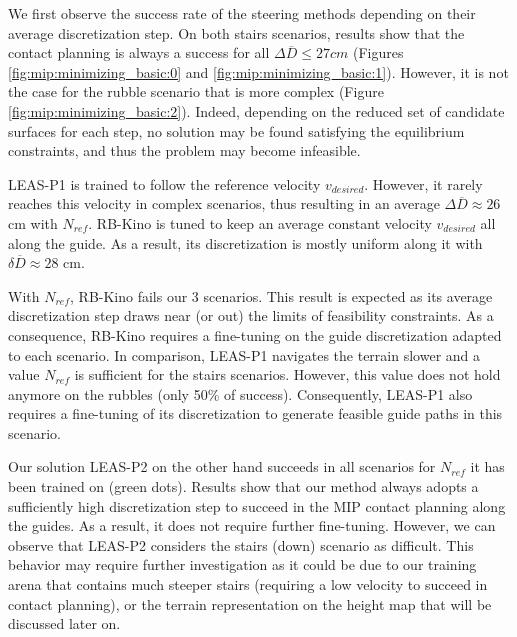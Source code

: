 We first observe the success rate of the steering methods depending on their average discretization step.
On both stairs scenarios, results show that the contact planning is always a success for all $\Delta \overline{D} \leq 27 cm$ (Figures \ref{fig:mip:minimizing_basic:0} and \ref{fig:mip:minimizing_basic:1}).
However, it is not the case for the rubble scenario that is more complex (Figure \ref{fig:mip:minimizing_basic:2}). Indeed, depending on the reduced set of candidate surfaces for each step, no solution may be found satisfying the equilibrium constraints, and thus the problem may become infeasible.

LEAS-P1 is trained to follow the reference velocity $v_{desired}$.
However, it rarely reaches this velocity in complex scenarios, thus resulting in an average $\Delta \overline{D} \approx 26$ cm with $N_{ref}$.
RB-Kino is tuned to keep an average constant velocity $v_{desired}$ all along the guide. As a result, its discretization is mostly uniform along it with $\delta \overline{D} \approx 28$ cm.

With $N_{ref}$, RB-Kino fails our 3 scenarios. This result is expected as its average discretization step draws near (or out) the limits of feasibility constraints.
As a consequence, RB-Kino requires a fine-tuning on the guide discretization adapted to each scenario.
In comparison, LEAS-P1 navigates the terrain slower and a value $N_{ref}$ is sufficient for the stairs scenarios. 
However, this value does not hold anymore on the rubbles (only 50\% of success). 
Consequently, LEAS-P1 also requires a fine-tuning of its discretization to generate feasible guide paths in this scenario.

Our solution LEAS-P2 on the other hand succeeds in all scenarios for $N_{ref}$ it has been trained on (green dots).
Results show that our method always adopts a sufficiently high discretization step to succeed in the MIP contact planning along the guides. %
As a result, it does not require further fine-tuning.
However, we can observe that LEAS-P2 considers the stairs (down) scenario as difficult.
This behavior may require further investigation as it could be due to our training arena that contains much steeper stairs (requiring a low velocity to succeed in contact planning), or the terrain representation on the height map that will be discussed later on.


